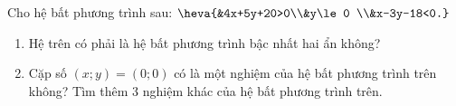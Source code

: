 \begin{bt}%
	Cho hệ bất phương trình sau: $ \heva{&4x+5y+20>0\\&y\le 0 \\&x-3y-18<0.} $
	\begin{enumerate}
		\item Hệ trên có phải là hệ bất phương trình bậc nhất hai ẩn không?
		\item Cặp số $ (x;y)=(0;0) $ có là một nghiệm của hệ bất phương trình trên không? Tìm thêm 3 nghiệm khác của hệ bất phương trình trên.
	\end{enumerate}
\end{bt}

